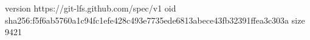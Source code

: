 version https://git-lfs.github.com/spec/v1
oid sha256:f5f6ab5760a1c94fc1efe428c493e7735ede6813abece43fb32391ffea3c303a
size 9421
